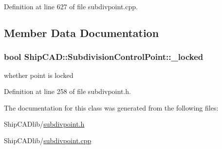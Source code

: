 Definition at line 627 of file subdivpoint.\-cpp.



\subsection{Member Data Documentation}
\hypertarget{classShipCAD_1_1SubdivisionControlPoint_acf4dc0c2a3d4c52847c68a8a412669f5}{
\subsubsection[{\-\_\-locked}]{\setlength{\rightskip}{0pt plus 5cm}bool Ship\-C\-A\-D\-::\-Subdivision\-Control\-Point\-::\-\_\-locked\hspace{0.3cm}{\ttfamily [protected]}}}\label{classShipCAD_1_1SubdivisionControlPoint_acf4dc0c2a3d4c52847c68a8a412669f5}
whether point is locked 

Definition at line 258 of file subdivpoint.\-h.



The documentation for this class was generated from the following files\-:\begin{DoxyCompactItemize}
\item 
Ship\-C\-A\-Dlib/\hyperlink{subdivpoint_8h}{subdivpoint.\-h}\item 
Ship\-C\-A\-Dlib/\hyperlink{subdivpoint_8cpp}{subdivpoint.\-cpp}\end{DoxyCompactItemize}
